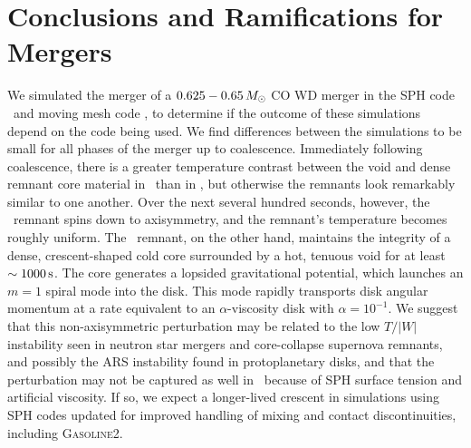 \section{Conclusions and Ramifications for Mergers}
\label{sec:c3_conclusion}

We simulated the merger of a $0.625-0.65\,\Msun$ CO WD merger in the SPH code \gasoline\ and moving mesh code \arepo, to determine if the outcome of these simulations depend on the code being used.  We find differences between the simulations to be small for all phases of the merger up to coalescence.  Immediately following coalescence, there is a greater temperature contrast between the void and dense remnant core material in \arepo\ than in \gasoline, but otherwise the remnants look remarkably similar to one another.  Over the next several hundred seconds, however, the \gasoline\ remnant spins down to axisymmetry, and the remnant's temperature becomes roughly uniform.  The \arepo\ remnant, on the other hand, maintains the integrity of a dense, crescent-shaped cold core surrounded by a hot, tenuous void for at least $\sim1000\,\mathrm{s}$.  The core generates a lopsided gravitational potential, which launches an $m = 1$ spiral mode into the disk.  This mode rapidly transports disk angular momentum at a rate equivalent to an $\alpha$-viscosity disk with $\alpha = 10^{-1}$.  We suggest that this non-axisymmetric perturbation may be related to the low $T/|W|$ instability seen in neutron star mergers and core-collapse supernova remnants, and possibly the ARS instability found in protoplanetary disks, and that the perturbation may not be captured as well in \gasoline\ because of SPH surface tension and artificial viscosity.  If so, we expect a longer-lived crescent in simulations using SPH codes updated for improved handling of mixing and contact discontinuities, including \textsc{Gasoline2}.

